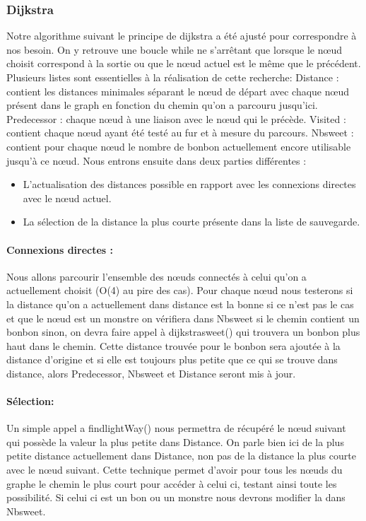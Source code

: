 \documentclass[12pt, oneside]{article}
\begin{document}
\subsubsection{Dijkstra}
Notre algorithme suivant le principe de dijkstra a été ajusté pour correspondre à nos besoin. On y retrouve une boucle while ne s’arrêtant que lorsque le nœud choisit correspond à la sortie ou que le nœud actuel est le même que le précédent. 
Plusieurs listes sont essentielles à la réalisation de cette recherche:
Distance : contient les distances minimales séparant le nœud de départ avec chaque nœud présent dans le graph en fonction du chemin qu’on a parcouru jusqu’ici.
Predecessor : chaque nœud à une liaison avec le nœud qui le précède.
Visited : contient chaque nœud ayant été testé au fur et à mesure du parcours.
Nb\textunderscore sweet : contient pour chaque nœud le nombre de bonbon actuellement encore utilisable jusqu’à ce nœud.
Nous entrons ensuite dans deux parties différentes : 
\begin{itemize}
\item 
L’actualisation des distances possible en rapport avec les connexions directes avec le nœud actuel.
\item
La sélection de la distance la plus courte présente dans la liste de sauvegarde.
\end{itemize}

\paragraph{Connexions directes :}
Nous allons parcourir l’ensemble des nœuds connectés à celui qu’on a actuellement choisit (O(4) au pire des cas). Pour chaque nœud nous testerons si la distance qu’on a actuellement dans distance est la bonne si ce n’est pas le cas et que le nœud est un monstre on vérifiera dans Nb\textunderscore sweet si le chemin contient un bonbon sinon, on devra faire appel à dijkstra\textunderscore sweet() qui trouvera un bonbon plus haut dans le chemin. Cette distance trouvée pour le bonbon sera ajoutée à la distance d’origine et si elle est toujours plus petite que ce qui se trouve dans distance, alors Predecessor, Nb\textunderscore sweet et Distance seront mis à jour.

\paragraph{Sélection:}
Un simple appel a find\textunderscore lightWay() nous permettra de récupéré le nœud suivant qui possède la valeur la plus petite dans Distance. On parle bien ici de la plus petite distance actuellement dans Distance, non pas de la distance la plus courte avec le nœud suivant.
Cette technique permet d’avoir pour tous les nœuds du graphe le chemin le plus court pour accéder à celui ci, testant ainsi toute les possibilité. Si celui ci est un bon ou un monstre nous devrons modifier la dans Nb\textunderscore sweet.
\end{document}
